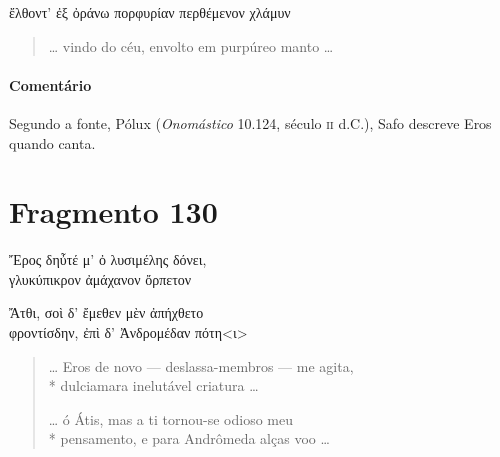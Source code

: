 \begin{gkverse}
ἔλθοντ’ ἐξ ὀράνω πορφυρίαν περθέμενον χλάμυν
\end{gkverse}

\begin{verse}
\ldots{} vindo do céu, envolto em purpúreo manto \ldots{} 
\end{verse}

{\paragraph{Comentário} Segundo a fonte, Pólux (\textit{Onomástico} 10.124, século \textsc{ii} d.C.), Safo descreve Eros quando canta.}

\section{Fragmento 130}

\begin{gkverse}
Ἔρος δηὖτέ μ’ ὀ λυσιμέλης δόνει,\\
			γλυκύπικρον ἀμάχανον ὄρπετον\\

\ast\quad\ast\quad\ast

			Ἄτθι, σοὶ δ’ ἔμεθεν μὲν ἀπήχθετο\\
φροντίσδην, ἐπὶ δ’ Ἀνδρομέδαν πότη<ι>

\end{gkverse}

\begin{verse}
\ldots{} Eros de novo --- deslassa-membros --- me agita,\\*
dulciamara inelutável criatura \ldots{}

\ast\quad\ast\quad\ast

\ldots{} ó Átis, mas a ti tornou-se odioso meu\\*
pensamento, e para Andrômeda alças voo \ldots{}
\end{verse}

